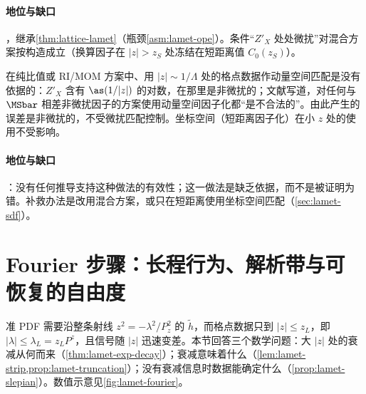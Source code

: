 \paragraph{地位与缺口}
\tagA，继承\cref{thm:lattice-lamet}（瓶颈\cref{asm:lamet-ope}）。条件“$Z'_X$ 处处微扰”对混合方案按构造成立（换算因子在 $|z|>z_S$ 处冻结在短距离值 $C_0(z_S)$）。

\begin{remark}\label{rem:lamet-ratio-large-z}
在纯比值或 RI/MOM 方案中、用 $|z|\sim1/\Lambda$ 处的格点数据作动量空间匹配是没有依据的：$Z'_X$ 含有 $\as(1/|z|)$ 的对数，在那里是非微扰的；文献\cite{JiEtAl2021}写道，对任何与 $\MSbar$ 相差非微扰因子的方案使用动量空间因子化都“是不合法的”。由此产生的误差是非微扰的，不受微扰匹配控制。坐标空间（短距离因子化）在小 $z$ 处的使用不受影响。
\end{remark}

\paragraph{地位与缺口}
\tagC：没有任何推导支持这种做法的有效性；这一做法是缺乏依据，而不是被证明为错。补救办法是改用混合方案，或只在短距离使用坐标空间匹配（\cref{sec:lamet-sdf}）。

\section{Fourier 步骤：长程行为、解析带与可恢复的自由度}\label{sec:lamet-fourier}

准 PDF 需要沿整条射线 $z^2=-\lambda^2/P_z^2$ 的 $\tilde h$，而格点数据只到 $|z|\le z_L$，即 $|\lambda|\le\lambda_L=z_LP^z$，且信号随 $|z|$ 迅速变差。本节回答三个数学问题：大 $|z|$ 处的衰减从何而来（\cref{thm:lamet-exp-decay}）；衰减意味着什么（\cref{lem:lamet-strip,prop:lamet-truncation}）；没有衰减信息时数据能确定什么（\cref{prop:lamet-slepian}）。数值示意见\cref{fig:lamet-fourier}。


